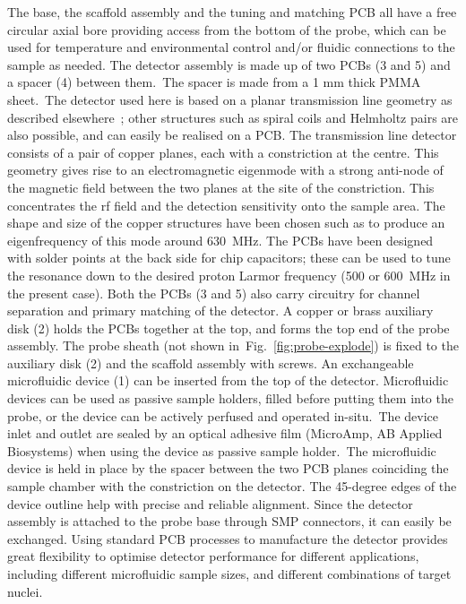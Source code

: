 \documentclass[preprint,5p]{elsarticle}
\newcommand{\fig}[1]{Fig.~\ref{#1}}
\begin{document}
The base, the scaffold assembly and the tuning and matching PCB all have a free circular
axial bore providing access from the bottom of the probe, which can be used for
temperature and environmental control and/or fluidic connections to the sample as
needed. The detector assembly is made up of two PCBs (3 and 5) and a spacer (4) between them.\cbstart\ The spacer is made from a 1 mm thick PMMA sheet.\cbend\ The detector used here is based on a planar transmission line geometry as described elsewhere~\cite{gream_2016,stripline_jan}; other structures such as spiral
coils and Helmholtz pairs are also possible, and can easily be realised on a PCB.
The transmission line detector consists of a pair of copper
planes, each with a constriction at the centre.  This geometry gives rise to an
electromagnetic eigenmode with a strong anti-node of the magnetic field between
the two planes at the site of the constriction. This concentrates the rf field
and the detection sensitivity
onto the sample area.
The shape and size of the copper structures have been chosen such as to produce
an eigenfrequency of this mode around 630~MHz. The PCBs have been designed with
solder points at the back side for chip capacitors; these can be used to tune the
resonance down to the desired proton Larmor frequency (500 or 600~MHz in the present case).
Both the PCBs (3 and 5) also carry circuitry for channel separation and primary
matching of the detector. A copper or brass auxiliary disk (2) holds the PCBs
together at the top, and forms the top end of the probe assembly.
The probe sheath (not shown in~\fig{fig:probe-explode}) is fixed to the auxiliary disk (2)
and the scaffold assembly with screws.
An exchangeable microfluidic device (1) can be inserted from the top of the detector.
Microfluidic devices can be used as passive sample holders, filled before putting them
into the probe,
or the device can be actively perfused and operated in-situ.\cbstart\ The device inlet and outlet are sealed by an optical adhesive film (MicroAmp, AB Applied Biosystems)
when using the device as passive sample holder.\cbend\ The microfluidic device is held in place by the spacer
between the two PCB planes coinciding the sample chamber with the constriction on the
detector. The 45-degree edges of the device outline help with precise and reliable
alignment.
Since the detector assembly is attached to the probe base through SMP
connectors, it can easily be exchanged.
Using standard PCB processes to manufacture the detector provides great flexibility
to optimise detector performance for different applications, including different
microfluidic sample sizes, and different combinations of target nuclei.
\end{document}
